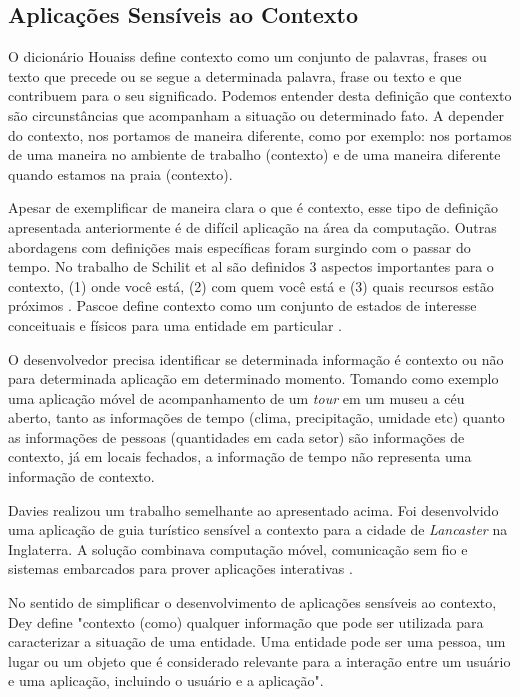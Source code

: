 \subsection{Aplicações Sensíveis ao Contexto}\label{subsec:contexto}

O dicionário Houaiss define contexto como um conjunto de palavras, frases ou
texto que precede ou se segue a determinada palavra, frase ou texto e que
contribuem para o seu significado. Podemos entender desta definição que contexto
são circunstâncias que acompanham a situação ou determinado fato. A depender do
contexto, nos portamos de maneira diferente, como por exemplo: nos portamos de
uma maneira no ambiente de trabalho (contexto) e de uma maneira diferente quando
estamos na praia (contexto).


Apesar de exemplificar de maneira clara o que é contexto, esse tipo de definição
apresentada anteriormente é de difícil aplicação na área da computação.
Outras abordagens com definições mais específicas foram surgindo com o
passar do tempo. No trabalho de Schilit et al são definidos 3 aspectos
importantes para o contexto, (1) onde você está, (2) com quem você está e (3)
quais recursos estão próximos \cite{schilit1994context}. Pascoe define contexto 
como um conjunto de estados de interesse conceituais e físicos para uma entidade 
em particular \cite{pascoe1998adding}.

O desenvolvedor precisa identificar se determinada informação é contexto ou não
para determinada aplicação em determinado momento. Tomando como exemplo uma
aplicação móvel de acompanhamento de um \textit{tour} em um museu a céu aberto, 
tanto as informações de tempo (clima, precipitação, umidade etc) quanto as 
informações de pessoas (quantidades em cada setor) são informações de contexto, 
já em locais fechados, a informação de tempo não representa uma informação de 
contexto.

Davies realizou um trabalho semelhante ao apresentado acima. Foi 
desenvolvido uma aplicação de guia turístico sensível a contexto para a cidade 
de \textit{Lancaster} na Inglaterra. A solução combinava computação móvel, 
comunicação sem fio e sistemas embarcados para prover aplicações interativas
\cite{davies1999caches}.

No sentido de simplificar o desenvolvimento de aplicações sensíveis ao contexto,
Dey define "contexto (como) qualquer informação que pode ser utilizada para
caracterizar a situação de uma entidade. Uma entidade pode ser uma pessoa, um
lugar ou um objeto que é considerado relevante para a interação entre um usuário
e uma aplicação, incluindo o usuário e a aplicação".


